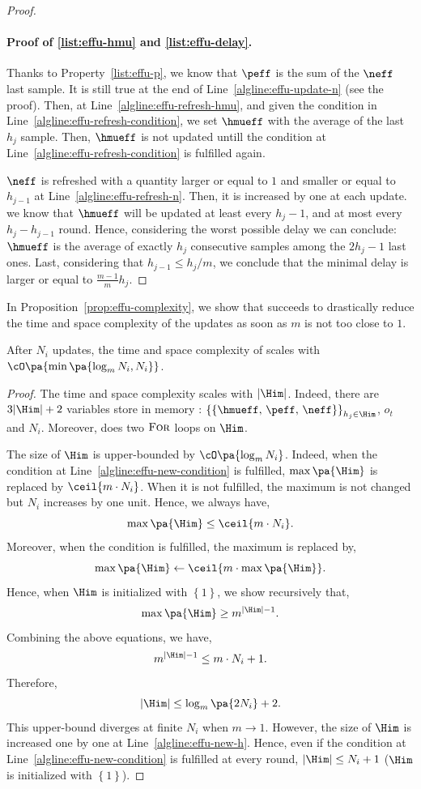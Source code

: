 \begin{proof}
\paragraph{Proof of \ref{list:effu-hmu} and \ref{list:effu-delay}.}
Thanks to Property~\ref{list:effu-p}, we know that $\peff$ is the sum of the $\neff$ last sample. It is still true at the end of Line~\ref{algline:effu-update-n} (see the proof). Then, at Line~\ref{algline:effu-refresh-hmu}, and given the condition in Line~\ref{algline:effu-refresh-condition}, we set $\hmueff$ with the average of the last $h_j$ sample. Then, $\hmueff$ is not updated untill the condition at Line~\ref{algline:effu-refresh-condition} is fulfilled again. 

$\neff$ is refreshed with a quantity larger or equal to $1$ and smaller or equal to $h_{j-1}$ at Line~\ref{algline:effu-refresh-n}. Then, it is increased by one at each update. we know that $\hmueff$ will be updated at least every $h_j-1$, and at most every $h_j -h_{j-1}$ round. Hence, considering the worst possible delay we can conclude: $\hmueff$ is the average of exactly $h_j$ consecutive samples among the $2h_j -1$ last ones. Last, considering that $h_{j-1}\leq h_j /m$, we conclude that the minimal delay is larger or equal to $\frac{m-1}{m}h_j$.
\end{proof}

In Proposition~\ref{prop:effu-complexity}, we show that \EFFU succeeds to drastically reduce the time and space complexity of the updates as soon as $m$ is not too close to $1$.
\begin{proposition}
\label{prop:effu-complexity}
After $N_i$ updates, the time and space complexity of \EFFU scales with $\cO\pa{\min\pa{ \log_m{N_i}, N_i}} $.
\end{proposition}
\begin{proof}
The time and space complexity scales with $|\Him|$. Indeed, there are $3|\Him| + 2$ variables store in memory : $\left\{ \{ \hmueff,\, \peff, \, \neff \}\right\}_{h_j \in \Him}$, $o_t$ and $N_i$. Moreover, \EFFU does two $\textsc{For}$ loops on $\Him$.

The size of $\Him$ is upper-bounded by $\cO\pa{\log_m N_i}$. Indeed, when the condition at Line~\ref{algline:effu-new-condition} is fulfilled, $\max\pa{\Him}$ is replaced by $\ceil{m\cdot N_i}$. When it is not fulfilled, the maximum is not changed but $N_i$ increases by one unit. Hence, we always have, 
\[
\max\pa{\Him} \leq \ceil{m\cdot N_i}.
\]
Moreover, when the condition is fulfilled, the maximum is replaced by,
\[
\max\pa{\Him} \leftarrow \ceil{m \cdot\max\pa{\Him}}.
\]
Hence, when $\Him$ is initialized with $\left\{1\right\}$, we show recursively that, 
\[\max\pa{\Him} \geq m^{|\Him|-1}. \]
Combining the above equations, we have, 
\[m^{|\Him|-1} \leq m\cdot N_i +1. \]
Therefore, 
\[|\Him| \leq \log_m\pa{2N_i} + 2. \]
This upper-bound diverges at finite $N_i$ when $m\rightarrow 1$. However, the size of $\Him$ is increased one by one at Line~\ref{algline:effu-new-h}. Hence, even if the condition at Line~\ref{algline:effu-new-condition} is fulfilled at every round, $|\Him|\leq N_i +1$ ($\Him$ is initialized with $\left\{1\right\}$).
\end{proof}

